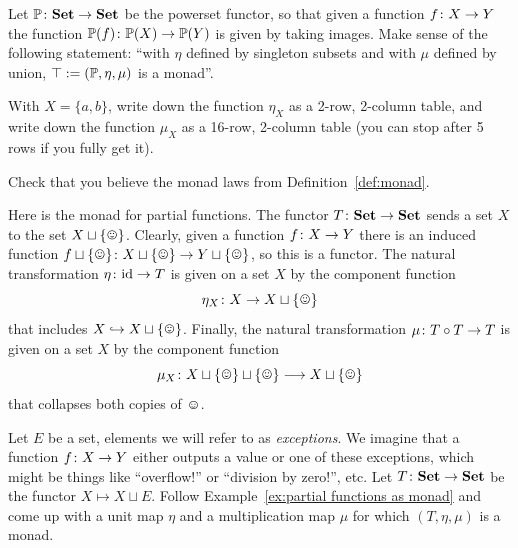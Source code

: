 \documentclass[CT4S-EN-RU]{subfiles}
\begin{document}
\begin{exampleRUS}\label{ex:monad}
\end{exampleRUS}

\begin{exerciseENG}\label{exc:power set monad}
Let ${\mathbb P}\colon{\mathbf{Set}}\rightarrow{\mathbf{Set}}$ be the powerset functor, so that given a function $f\colon X\rightarrow Y$ the function ${\mathbb P}(f)\colon{\mathbb P}(X)\rightarrow{\mathbb P}(Y)$ is given by taking images.
\sexc Make sense of the following statement: “with $\eta$ defined by singleton subsets and with $\mu$ defined by union, $\top:=({\mathbb P},\eta,\mu)$ is a monad”.
\item  With $X=\{a,b\}$, write down the function $\eta_X$ as a 2-row, 2-column table, and write down the function $\mu_X$ as a 16-row, 2-column table (you can stop after 5 rows if you fully get it).
\item Check that you believe the monad laws from Definition~\ref{def:monad}.
\endsexc
\end{exerciseENG}

\begin{exerciseRUS}\label{exc:power set monad}
\end{exerciseRUS}

\begin{exampleENG}\label{ex:partial functions as monad}
Here is the monad for partial functions. The functor $T\colon{\mathbf{Set}}\rightarrow{\mathbf{Set}}$ sends a set $X$ to the set $X\sqcup\singleton$. Clearly, given a function $f\colon X\rightarrow Y$ there is an induced function $f\sqcup\singleton\taking X\sqcup\singleton\to Y\sqcup\singleton$, so this is a functor. The natural transformation $\eta\colon\textnormal{id}\rightarrow T$ is given on a set $X$ by the component function $$\eta_X\taking X\to X\sqcup\singleton$$ that includes $X\inj X\sqcup\singleton$. Finally, the natural transformation $\mu\colon T\circ T\rightarrow T$ is given on a set $X$ by the component function $$\mu_X\taking X\sqcup\singleton\sqcup\singleton\too X\sqcup\singleton$$ that collapses both copies of $\smiley$.
\end{exampleENG}

\begin{exampleRUS}\label{ex:partial functions as monad}
\end{exampleRUS}

\begin{exerciseENG}\label{exc:exceptions}
Let $E$ be a set, elements we will refer to as {\em exceptions}. We imagine that a function $f\colon X\rightarrow Y$ either outputs a value or one of these exceptions, which might be things like “overflow!” or “division by zero!”, etc. Let $T\colon{\mathbf{Set}}\rightarrow{\mathbf{Set}}$ be the functor $X\mapsto X\sqcup E$. Follow Example~\ref{ex:partial functions as monad} and come up with a unit map $\eta$ and a multiplication map $\mu$ for which $(T,\eta,\mu)$ is a monad.
\end{exerciseENG}
\end{document}
